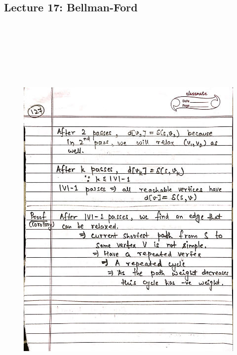 \newpage
{\color{black} \subsection*{Lecture 17: Bellman-Ford}}
\begin{figure}[H]
    \centering
    \includegraphics[width=16cm, height=21cm]{"./MIT-6.006/MIT-6006-127"}
\end{figure}

